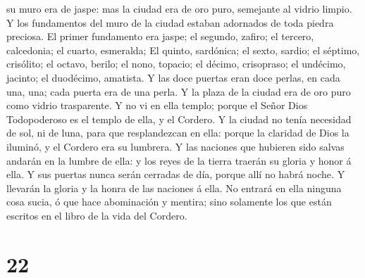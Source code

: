 su muro era de jaspe: mas la ciudad era de oro puro, semejante al vidrio
limpio.  Y los fundamentos del muro de la ciudad estaban
adornados de toda piedra preciosa. El primer fundamento era jaspe; el
segundo, zafiro; el tercero, calcedonia; el cuarto, esmeralda;
 El quinto, sardónica; el sexto, sardio; el séptimo,
crisólito; el octavo, berilo; el nono, topacio; el décimo, crisopraso;
el undécimo, jacinto; el duodécimo, amatista.  Y las doce
puertas eran doce perlas, en cada una, una; cada puerta era de una
perla. Y la plaza de la ciudad era de oro puro como vidrio trasparente.
 Y no vi en ella templo; porque el Señor Dios
Todopoderoso es el templo de ella, y el Cordero.  Y la
ciudad no tenía necesidad de sol, ni de luna, para que resplandezcan en
ella: porque la claridad de Dios la iluminó, y el Cordero era su
lumbrera.  Y las naciones que hubieren sido salvas
andarán en la lumbre de ella: y los reyes de la tierra traerán su gloria
y honor á ella.  Y sus puertas nunca serán cerradas de
día, porque allí no habrá noche.  Y llevarán la gloria y
la honra de las naciones á ella.  No entrará en ella
ninguna cosa sucia, ó que hace abominación y mentira; sino solamente los
que están escritos en el libro de la vida del Cordero.

\hypertarget{section-21}{%
\section{22}\label{section-21}}

